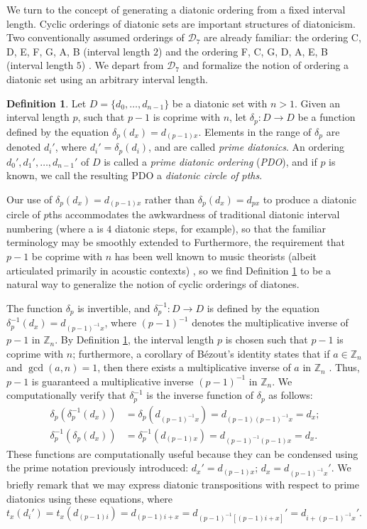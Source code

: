 \documentclass{article}
\theoremstyle{plain}
\theoremstyle{definition}
\newtheorem{definition}[theorem]{Definition}
\theoremstyle{remark}
\begin{document}
We turn to the concept of generating a diatonic ordering from a fixed interval length. Cyclic orderings of diatonic sets are important structures of diatonicism. Two conventionally assumed orderings of $\mathcal{D}_7$ are already familiar: the  ordering C, D, E, F, G, A, B (interval length $2$) and the  ordering F, C, G, D, A, E, B (interval length $5$) \cite{Hook}. We depart from $\mathcal{D}_7$ and formalize the notion of ordering a diatonic set using an arbitrary interval length.

\begin{definition}
\label{DEF.PDO}
	Let $D=\{d_0,\dots,d_{n-1}\}$ be a diatonic set with $n>1$. Given an interval length $p$, such that $p-1$ is coprime with $n$, let $\delta_p:D\to D$ be a function defined by the equation $\delta_p(d_x)=d_{(p-1)x}$. Elements in the range of $\delta_p$ are denoted $d_i'$, where $d_i'=\delta_p(d_i)$, and are called \textit{prime diatonics}. An ordering $d_0',d_1',\dots,d_{n-1}'$ of $D$ is called a \textit{prime diatonic ordering} (\textit{PDO}), and if $p$ is known, we call the resulting PDO a \textit{diatonic circle of $p$ths}.
\end{definition}

Our use of $\delta_p(d_x)=d_{(p-1)x}$ rather than $\delta_p(d_x)=d_{px}$ to produce a diatonic circle of $p$ths accommodates the awkwardness of traditional diatonic interval numbering (where a  is $4$ diatonic steps, for example), so that the familiar  terminology may be smoothly extended to  Furthermore, the requirement that $p-1$ be coprime with $n$ has been well known to music theorists (albeit articulated primarily in acoustic contexts) \cite{Gamer}, so we find Definition \ref{DEF.PDO} to be a natural way to generalize the notion of cyclic orderings of diatones.

The function $\delta_p$ is invertible, and $\delta_p^{-1}:D\to D$ is defined by the equation $\delta_p^{-1}(d_x)=d_{(p-1)^{-1}x}$, where $(p-1)^{-1}$ denotes the multiplicative inverse of $p-1$ in $\mathbb{Z}_n$. By Definition \ref{DEF.PDO}, the interval length $p$ is chosen such that $p-1$ is coprime with $n$; furthermore, a corollary of Bézout's identity states that if $a\in\mathbb{Z}_n$ and $\gcd{(a,n)}=1$, then there exists a multiplicative inverse of $a$ in $\mathbb{Z}_n$ \cite{Bezout}. Thus, $p-1$ is guaranteed a multiplicative inverse $(p-1)^{-1}$ in $\mathbb{Z}_n$. We computationally verify that $\delta_p^{-1}$ is the inverse function of $\delta_p$ as follows: \begin{align*} \delta_p(\delta_p^{-1}(d_x)) &= \delta_p(d_{(p-1)^{-1}x})=d_{(p-1)(p-1)^{-1}x}=d_x; \\ \delta_p^{-1}(\delta_p(d_x)) &= \delta_p^{-1}(d_{(p-1)x})=d_{(p-1)^{-1}(p-1)x}=d_x. \end{align*} These functions are computationally useful because they can be condensed using the prime notation previously introduced: $d_x'=d_{(p-1)x}$; $d_x=d_{(p-1)^{-1}x}'$. We briefly remark that we may express diatonic transpositions with respect to prime diatonics using these equations, where $t_x(d_i')=t_x(d_{(p-1)i})=d_{(p-1)i+x}=d_{(p-1)^{-1}[(p-1)i+x]}'=d_{i+(p-1)^{-1}x}'$.
\end{document}
